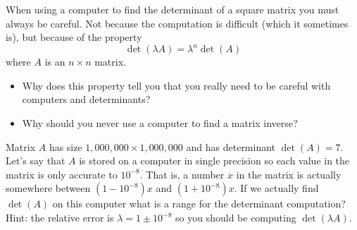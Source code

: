 \begin{problem}
    When using a computer to find the determinant of a square matrix you must always be careful.  Not because the
    computation is difficult (which it sometimes is), but because of the property
    \[ \det(\lambda A) = \lambda^n \det(A) \]
    where $A$ is an $n \times n$ matrix.

    \begin{itemize}
        \item Why does this property tell you that you really need to be careful with computers and
            determinants?  
        \item Why should you never use a computer to find a matrix inverse?
    \end{itemize}
\end{problem}


\begin{problem}
    Matrix $A$ has size $1,000,000 \times 1,000,000$ and has determinant $\det(A) = 7$.  Let's say
    that $A$ is stored on a computer in single precision so each value in the matrix is
    only accurate to $10^{-8}$.  That is, a number $x$ in the matrix is actually somewhere
    between $(1-10^{-8})x$ and $(1+10^{-8})x$.  If we actually find $\det(A)$ on this
    computer what is a range for the determinant computation? \\
    Hint: the relative error is $\lambda = 1 \pm 10^{-8}$ so you should be computing
    $\det(\lambda A)$.
\end{problem}

